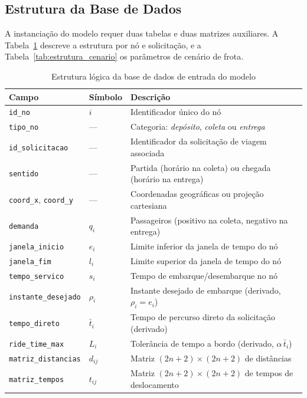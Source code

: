 \documentclass[12pt,a4paper]{article}
\theoremstyle{plain}
\begin{document}
\subsection{Estrutura da Base de Dados}

A instanciação do modelo requer duas tabelas e duas matrizes auxiliares. A Tabela~\ref{tab:estrutura_dados} descreve a estrutura por nó e solicitação, e a Tabela~\ref{tab:estrutura_cenario} os parâmetros de cenário de frota.

\begin{table}[htbp]
\centering
\caption{Estrutura lógica da base de dados de entrada do modelo}
\label{tab:estrutura_dados}
\small
\begin{tabular}{@{}lll@{}}
\toprule
\textbf{Campo} & \textbf{Símbolo} & \textbf{Descrição} \\
\midrule
\texttt{id\_no}            & $i$              & Identificador único do nó \\
\texttt{tipo\_no}          & ---              & Categoria: \textit{depósito}, \textit{coleta} ou \textit{entrega} \\
\texttt{id\_solicitacao}   & ---              & Identificador da solicitação de viagem associada \\
\texttt{sentido}           & ---              & Partida (horário na coleta) ou chegada (horário na entrega) \\
\texttt{coord\_x}, \texttt{coord\_y} & ---    & Coordenadas geográficas ou projeção cartesiana \\
\texttt{demanda}           & $q_i$            & Passageiros (positivo na coleta, negativo na entrega) \\
\texttt{janela\_inicio}    & $e_i$            & Limite inferior da janela de tempo do nó \\
\texttt{janela\_fim}       & $l_i$            & Limite superior da janela de tempo do nó \\
\texttt{tempo\_servico}    & $s_i$            & Tempo de embarque/desembarque no nó \\
\texttt{instante\_desejado}& $\rho_i$         & Instante desejado de embarque (derivado, $\rho_i = e_i$) \\
\texttt{tempo\_direto}     & $\bar{t}_i$      & Tempo de percurso direto da solicitação (derivado) \\
\texttt{ride\_time\_max}   & $L_i$            & Tolerância de tempo a bordo (derivado, $\alpha\,\bar{t}_i$) \\
\midrule
\texttt{matriz\_distancias}& $d_{ij}$         & Matriz $(2n{+}2) \times (2n{+}2)$ de distâncias \\
\texttt{matriz\_tempos}    & $t_{ij}$         & Matriz $(2n{+}2) \times (2n{+}2)$ de tempos de deslocamento \\
\bottomrule
\end{tabular}
\end{table}
\end{document}
